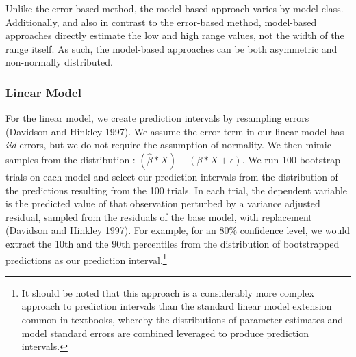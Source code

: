 \documentclass[colTwo]{anon}
\theoremstyle{definition}
\begin{document}
Unlike the error-based method, the model-based approach varies by model class. Additionally, and also in contrast to the error-based method, model-based approaches directly estimate the low and high range values, not the width of the range itself. As such, the model-based approaches can be both asymmetric and non-normally distributed. 

\subsubsection{Linear Model}

For the linear model, we create prediction intervals by resampling errors (Davidson and Hinkley 1997). We assume the error term in our linear model has \textit{iid} errors, but we do not require the assumption of normality. We then mimic samples from the distribution : \((\widehat{\beta}*X) - (\beta*X + \epsilon)\). We run 100 bootstrap trials on each model and select our prediction intervals from the distribution of the predictions resulting from the 100 trials. In each trial, the dependent variable is the predicted value of that observation perturbed by a variance adjusted residual, sampled from the residuals of the base model, with replacement (Davidson and Hinkley 1997).  For example, for an 80\% confidence level, we would extract the 10th and the 90th percentiles from the distribution of bootstrapped predictions as our prediction interval.\footnote{It should be noted that this approach is a considerably more complex approach to prediction intervals than the standard linear model extension common in textbooks, whereby the distributions of parameter estimates and model standard errors are combined leveraged to produce prediction intervals.}  
\end{document}
